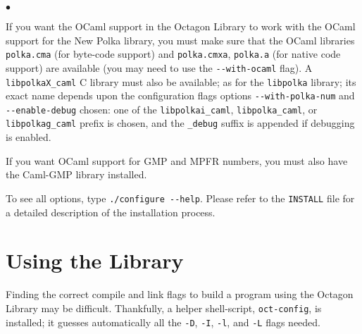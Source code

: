 \documentclass[twosides]{report}
\newenvironment{mylist}
        {\vskip-3mm\begin{list}{$\bullet$}{\setlength{\leftmargin}{.5cm}}}
        {\end{list}}
\begin{document}
\begin{mylist}
\item
If you want the OCaml support in the Octagon Library to work with the
OCaml support for the New Polka library, you must make sure that the
OCaml libraries {\tt polka.cma} (for byte-code support) and {\tt polka.cmxa},
{\tt polka.a} (for native code support) are available (you may need to use
the {\tt -{}-with-ocaml} flag).
A {\tt libpolkaX\_caml} C library must also be available; as for the 
{\tt libpolka}
library; its exact name depends upon the configuration flags options
{\tt -{}-with-polka-num} and {\tt -{}-enable-debug} chosen:
one of the {\tt libpolkai\_caml}, {\tt libpolka\_caml}, or 
{\tt libpolkag\_caml} 
prefix is chosen, and the {\tt \_debug} suffix is appended if debugging is
enabled.

\item
If you want OCaml support for GMP and MPFR numbers, you must also have
the Caml-GMP library \cite{MLGMP} installed.


\end{mylist}

\noindent
To see all options, type {\tt ./configure -{}-help}.
Please refer to the {\tt INSTALL} file for a detailed description of the
installation process.


\section{Using the Library}

Finding the correct compile and link flags to build a program using the
Octagon Library may be difficult.
Thankfully, a helper shell-script, {\tt oct-config}, is installed; it guesses
automatically all the {\tt -D}, {\tt -I}, {\tt -l}, and {\tt -L} flags needed.
\end{document}
